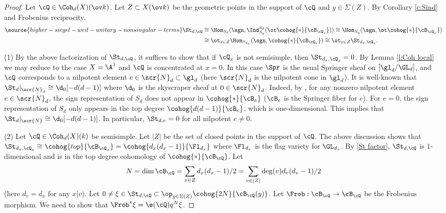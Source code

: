 \begin{proof}
Let $\cQ\in \Coh_{d}(X)(\ov k)$. Let $Z\subset X(\ov k)$ be the geometric points in the support of $\cQ$ and $y\in \Sigma(Z)$. By Corollary \ref{c:Sind} and Frobenius reciprocity,
\begin{align}\label{St factor}
\source{higher-siegel-weil-unitary-nonsingular-terms}
\St_{d,\cQ} &\cong \Hom_{S_{d}}(\sgn, \Ind^{S_{d}}_{S_{y}}(\ot \cohog{*}{\cB_{\cQ_{x}}}))\cong \Hom_{S_{y}}(\sgn, \ot \cohog{*}{\cB_{\cQ_{x}}}) \nonumber \\
&\cong  \ot_{x\in Z}\Hom_{S_{d_{x}}}(\sgn,\cohog{*}{\cB_{\cQ_{x}}})\cong \ot_{x\in Z}\St_{d_{x}, \cQ_{x}}.
\end{align}

(1) By the above factorization of $\St_{d,\cQ}$, it suffices to show that if $\cQ_{x}$ is not semisimple, then $\St_{d_{x}, \cQ_{x}}=0$. By Lemma \ref{l:Coh local} we may reduce to the case $X=\A^{1}$ and $\cQ$ is concentrated at $x=0$. In this case $\Spr$ is the usual Springer sheaf on $[\gl_{d}/\GL_{d}]$, and $\cQ$ corresponds to a nilpotent element $e\in \scr{N}_{d}\subset \gl_{d}$ (here $\scr{N}_d$ is the nilpotent cone in $\gl_d$). It is well-known that $\St_{d}|_{\scr{N}_{d}}\cong \d_{0}[-d(d-1)]$ where $\d_{0}$ is the skyscraper sheaf at $0\in \scr{N}_{d}$. Indeed, by \cite[\S3.4, Corollary (b)]{BM}, for any nonzero nilpotent element $e\in \scr{N}_{d}$, the sign representation of $S_{d}$ does not appear in $\cohog{*}{\cB_{e}}$ ($\cB_{e}$ is the Springer fiber for $e$). For $e=0$, the sign representation of $S_{d}$ only appears in the top degree $\cohog{d(d-1)}{\cB_{e}}$, which is one-dimensional. This implies that $\St_{d}|_{\scr{N}}\cong \d_{0}[-d(d-1)]$.
In particular, $\St_{d,e}=0$ for all nilpotent $e\ne 0$.

(2) Let $\cQ\in \Coh_{d}(X)(k)$ be semisimple. Let $|Z|$ be the set of closed points in the support of $\cQ$. The above discussion shows that $\St_{d_{x},\cQ_{x}}\cong \cohog{top}{\cB_{\cQ_{x}}} =\cohog{d_{x}(d_{x}-1)}{\Fl_{d_{x}}}$ where $\Fl_{d_{x}}$ is the flag variety for $\GL_{d_x}$. By \eqref{St factor}, $\St_{d,\cQ}$ is $1$-dimensional and is in the top degree cohomology of $\cohog{*}{\cB_{\cQ}}$. Let
\[
N=\dim \cB_{\cQ}=\sum_{x\in Z}d_{x}(d_{x}-1)/2=\sum_{v\in|Z|}\deg(v)d_{v}(d_{v}-1)/2
\]
(here $d_{v}=d_{x}$ for any $x|v$). Let $0\ne \xi\in \St_{d,\cQ}\subset \op_{y\in\Sigma(Z)}\cohog{2N}{\cB_{\cQ}(y)}$. Let $\Frob:\cB_{\cQ}\to\cB_{\cQ}$  be the Frobenius morphism. We need to show that $\Frob^{*}\xi=\e(\cQ)q^{N}\xi$.


\end{proof}
